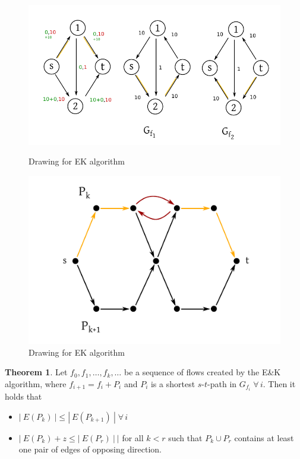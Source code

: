 \documentclass[a4paper]{article}
\theoremstyle{definition}
\newtheorem{theorem}{Theorem}
\newcommand{\card}[1]{\left|\:\!#1\:\!\right|}
\newcommand{\gath}[2]{$#1$-$#2$-path} %
\newcommand{\fall}{\;\forall\,}
\begin{document}
\begin{figure}[!ht]
 \begin{center}
  \includegraphics{img/ek_algorithm1.pdf}
  \caption{Drawing for EK algorithm}
 \end{center}
 \begin{center}
  \includegraphics{img/ek_algorithm.pdf}
  \caption{Drawing for EK algorithm}
 \end{center}
\end{figure}

\begin{theorem}\label{lemma-4.6}
  Let $f_0, f_1, \ldots, f_k, \ldots$ be a sequence of flows created by the E\&K algorithm, where $f_{i+1} = f_i + P_i$ and $P_i$ is a shortest \gath st in $G_{f_i} \fall i$. Then it holds that
  \begin{itemize}
    \item $\card{E(P_k)} \leq \card{E(P_{k+1})} \fall i$
    \item $\card{E(P_k) + z \leq \card{E(P_r)}}$ for all $k < r$ such that $P_k \cup P_r$ contains at least one pair of edges of opposing direction.
  \end{itemize}
\end{theorem}
\end{document}
